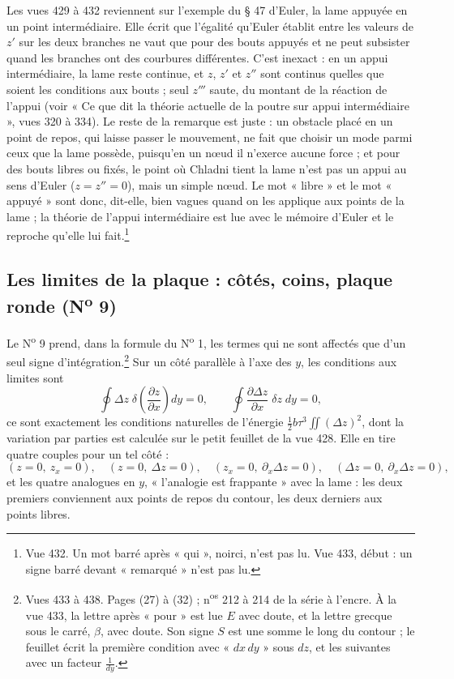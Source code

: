 \documentclass[11pt,a4paper]{article}
\begin{document}
Les vues 429 à 432 reviennent sur l'exemple du § 47 d'Euler, la lame appuyée en un
point intermédiaire. Elle écrit que l'égalité qu'Euler établit entre les valeurs de
$z'$ sur les deux branches ne vaut que pour des bouts appuyés et ne peut subsister
quand les branches ont des courbures différentes. C'est inexact : en un appui
intermédiaire, la lame reste continue, et $z$, $z'$ et $z''$ sont continus quelles
que soient les conditions aux bouts ; seul $z'''$ saute, du montant de la réaction de
l'appui (voir « Ce que dit la théorie actuelle de la poutre sur appui
intermédiaire », vues 320 à 334). Le reste de la remarque est juste : un obstacle placé en un point de repos,
qui laisse passer le mouvement, ne fait que choisir un mode parmi ceux que la lame
possède, puisqu'en un nœud il n'exerce aucune force ; et pour des bouts libres ou
fixés, le point où Chladni tient la lame n'est pas un appui au sens d'Euler
($z = z'' = 0$), mais un simple nœud. Le mot « libre » et le mot « appuyé » sont donc,
dit-elle, bien vagues quand on les applique aux points de la lame ; la théorie de
l'appui intermédiaire est lue avec le mémoire d'Euler et le reproche qu'elle lui
fait.\footnote{Vue 432. Un mot barré après « qui », noirci, n'est pas lu. Vue 433,
début : un signe barré devant « remarqué » n'est pas lu.}

\subsection*{Les limites de la plaque : côtés, coins, plaque ronde (N\textsuperscript{o} 9)}

Le N\textsuperscript{o} 9 prend, dans la formule du N\textsuperscript{o} 1, les termes
qui ne sont affectés que d'un seul signe d'intégration.\footnote{Vues 433 à 438. Pages
(27) à (32) ; n\textsuperscript{os} 212 à 214 de la série à l'encre. À la vue 433, la
lettre après « pour » est lue $E$ avec doute, et la lettre grecque sous le carré,
$\beta$, avec doute. Son signe $S$ est une somme le long du contour ; le feuillet écrit
la première condition avec « $dx\,dy$ » sous $dz$, et les suivantes avec un facteur
$\frac{1}{dy}$.} Sur un côté parallèle à l'axe des $y$, les conditions aux limites
sont
\[
\oint \Delta z\;\delta\!\left(\frac{\partial z}{\partial x}\right) dy = 0, \qquad
\oint \frac{\partial \Delta z}{\partial x}\;\delta z\; dy = 0,
\]
ce sont exactement les conditions naturelles de l'énergie
$\frac12 b\tau^3\iint(\Delta z)^2$, dont la variation par parties est calculée sur le
petit feuillet de la vue 428. Elle en tire quatre couples pour un tel côté :
\[
(z = 0,\ z_x = 0), \quad (z = 0,\ \Delta z = 0), \quad
(z_x = 0,\ \partial_x\Delta z = 0), \quad (\Delta z = 0,\ \partial_x\Delta z = 0),
\]
et les quatre analogues en $y$, « l'analogie est frappante » avec la lame : les deux
premiers conviennent aux points de repos du contour, les deux derniers aux points
libres.
\end{document}
